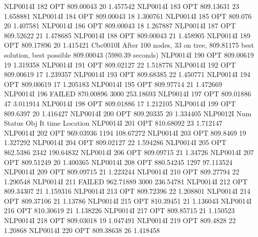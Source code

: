 NLP0014I           182         OPT 809.00043       20 1.457542
NLP0014I           183         OPT 809.13631       23 1.658881
NLP0014I           184         OPT 809.00043       18 1.300761
NLP0014I           185         OPT 809.076       20 1.407581
NLP0014I           186         OPT 809.00043       18 1.267887
NLP0014I           187         OPT 809.52622       21 1.478685
NLP0014I           188         OPT 809.00043       21 1.458905
NLP0014I           189         OPT 809.17896       20 1.415421
Cbc0010I After 100 nodes, 33 on tree, 809.81175 best solution, best possible 809.00043 (5980.39 seconds)
NLP0014I           190         OPT 809.00619       19 1.319358
NLP0014I           191         OPT 809.02127       22 1.518776
NLP0014I           192         OPT 809.00619       17 1.239357
NLP0014I           193         OPT 809.68385       22 1.450771
NLP0014I           194         OPT 809.00619       17 1.205183
NLP0014I           195         OPT 809.97714       21 1.472669
NLP0014I           196      FAILED 870.00896     3000 253.18693
NLP0014I           197         OPT 809.01886       47 3.011914
NLP0014I           198         OPT 809.01886       17 1.212105
NLP0014I           199         OPT 809.6397       20 1.416427
NLP0014I           200         OPT 809.20335       20 1.334405
NLP0012I 
              Num      Status      Obj             It       time                 Location
NLP0014I           201         OPT 810.68092       23 1.712147
NLP0014I           202         OPT 969.03936     1194 108.67272
NLP0014I           203         OPT 809.8469       19 1.327292
NLP0014I           204         OPT 809.02127       22 1.594286
NLP0014I           205         OPT 862.5386     2342 190.64832
NLP0014I           206         OPT 809.09715       21 1.34726
NLP0014I           207         OPT 809.51249       20 1.400365
NLP0014I           208         OPT 880.54245     1297 97.113524
NLP0014I           209         OPT 809.09715       21 1.223244
NLP0014I           210         OPT 809.27794       22 1.290548
NLP0014I           211      FAILED 962.71889     3000 236.54781
NLP0014I           212         OPT 809.34307       21 1.159316
NLP0014I           213         OPT 809.72396       22 1.208801
NLP0014I           214         OPT 809.37106       21 1.13786
NLP0014I           215         OPT 810.39451       21 1.136043
NLP0014I           216         OPT 810.30619       21 1.138226
NLP0014I           217         OPT 809.85715       21 1.150523
NLP0014I           218         OPT 809.03018       19 1.047491
NLP0014I           219         OPT 809.4828       22 1.20868
NLP0014I           220         OPT 809.38638       26 1.418458
